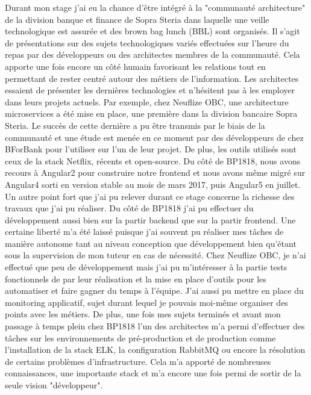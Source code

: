 \begin{changemargin}{-1cm}{-1cm}
	Durant mon stage j'ai eu la chance d'être intégré à la "communauté architecture" de la division banque et finance de Sopra Steria dans laquelle une veille technologique est assurée et des brown bag lunch (BBL) sont organisés. Il s'agit de présentations sur des sujets technologiques variés effectuées sur l'heure du repas par des développeurs ou des architectes membres de la communauté. Cela apporte une fois encore un côté humain favorisant les relations tout en permettant de rester centré autour des métiers de l'information. Les architectes essaient de présenter les dernières technologies et n'hésitent pas à les employer dans leurs projets actuels. Par exemple, chez Neuflize OBC, une architecture microservices a été mise en place, une première dans la division bancaire Sopra Steria. Le succès de cette dernière a pu être transmis par le biais de la communauté et une étude est menée en ce moment par des développeurs de chez BForBank pour l'utiliser sur l'un de leur projet. De plus, les outils utilisés sont ceux de la stack Netflix, récents et open-source. Du côté de BP1818, nous avons recours à Angular2 pour construire notre frontend et nous avons même migré sur Angular4 sorti en version stable au mois de mars 2017, puis Angular5 en juillet. \\
	
	Un autre point fort que j'ai pu relever durant ce stage concerne la richesse des travaux que j'ai pu réaliser. Du côté de BP1818 j'ai pu effectuer du développement aussi bien sur la partir backend que sur la partir frontend. Une certaine liberté m'a été laissé puisque j'ai souvent pu réaliser mes tâches de manière autonome tant au niveau conception que développement bien qu'étant sous la supervision de mon tuteur en cas de nécessité. Chez Neuflize OBC, je n'ai effectué que peu de développement mais j'ai pu m'intéresser à la partie tests fonctionnels de par leur réalisation et la mise en place d'outils pour les automatiser et faire gagner du temps à l'équipe. J'ai aussi pu mettre en place du monitoring applicatif, sujet durant lequel je pouvais moi-même organiser des points avec les métiers. De plus, une fois mes sujets terminés et avant mon passage à temps plein chez BP1818 l'un des architectes m'a permi d'effectuer des tâches sur les environnements de pré-production et de production comme l'installation de la stack ELK, la configuration RabbitMQ ou encore la résolution de certains problèmes d'infrastructure. Cela m'a apporté de nombreuses connaissances, une importante stack et m'a encore une fois permi de sortir de la seule vision "développeur". \\
	

\end{changemargin}
